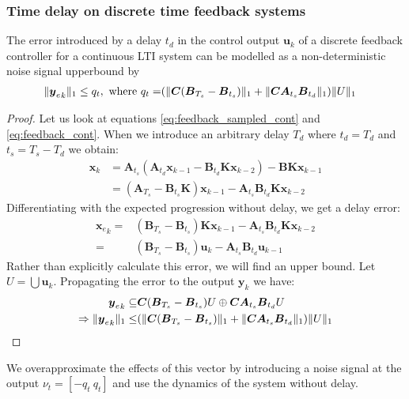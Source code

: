 \documentclass[sigconf]{llncs}
\DeclarePairedDelimiter\norm{\lVert}{\rVert}
\newcommand{\mat}[1]{\boldsymbol{#1}}
\renewcommand{\vec}[1]{\boldsymbol{#1}}
\begin{document}
\subsubsection{Time delay on discrete time feedback systems} \label{sec:delay}
\begin{theorem}
The error introduced by a delay $t_d$ in the control output $\vec{u}_k$ of a discrete feedback controller for a continuous LTI system can be modelled as a non-deterministic noise signal upperbound by 
\begin{align}
\norm{{\vec{y}_e}_{k}}_1 \leq q_t, \text{ where } q_t=&(\norm{\mat{C}(\mat{B}_{T_s}-\mat{B}_{t_s})}_1+\norm{\mat{C}\mat{A}_{t_s}\mat{B}_{t_d}}_1)\norm{U}_1
\end{align}
\end{theorem}

\begin{proof}
Let us look at equations \eqref{eq:feedback_sampled_cont} and
\eqref{eq:feedback_cont}.  When we introduce an arbitrary delay $T_d$ where
$t_d=T_d$ and $t_s=T_s-T_d$ we obtain:
%
\begin{align}
\vec{x}_{k} &=\mat{A}_{t_s}(\mat{A}_{t_d}\vec{x}_{k-1}-\mat{B}_{t_d}\mat{K}\vec{x}_{k-2})-\mat{B}\mat{K}\vec{x}_{k-1}\nonumber\\
&=  (\mat{A}_{T_s}-\mat{B}_{t_s}\mat{K})\vec{x}_{k-1}-\mat{A}_{t_s}\mat{B}_{t_d}\mat{K}\vec{x}_{k-2}
\label{eq:delay_cont}
\end{align}
%
Differentiating with the expected progression without delay, we get a delay
error:
%
\begin{align}
{\vec{x}_e}_{k}=&(\mat{B}_{T_s}-\mat{B}_{t_s})\mat{K}\vec{x}_{k-1}-\mat{A}_{t_s}\mat{B}_{t_d}\mat{K}\vec{x}_{k-2}\nonumber\\
=&(\mat{B}_{T_s}-\mat{B}_{t_s})\vec{u}_{k}-\mat{A}_{t_s}\mat{B}_{t_d}\vec{u}_{k-1}
\end{align}
Rather than explicitly calculate this error, we will find an upper bound. Let $U = \bigcup \vec{u}_k$. Propagating the error to the output $\vec{y}_k$ we have:
\begin{align}
{\vec{y}_e}_{k} \subseteq &\mat{C}(\mat{B}_{T_s}-\mat{B}_{t_s})U\oplus\mat{C}\mat{A}_{t_s}\mat{B}_{t_d}U\\
\Rightarrow \norm{{\vec{y}_e}_{k}}_1 \leq & (\norm{\mat{C}(\mat{B}_{T_s}-\mat{B}_{t_s})}_1+\norm{\mat{C}\mat{A}_{t_s}\mat{B}_{t_d}}_1)\norm{U}_1
\end{align}
\end{proof}
We overapproximate the effects of this vector by introducing a noise signal at the output $\nu_t=[-q_t\ q_t]$ and use the dynamics of the system without delay.
\end{document}
